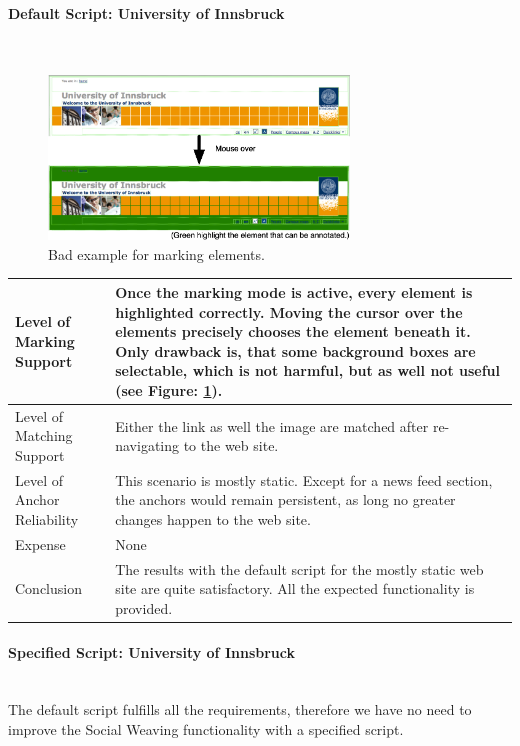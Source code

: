 \paragraph{Default Script: University of Innsbruck}\mbox{}\\
\begin{figure}\centering
		\includegraphics[width=8cm]{images/bad-example-backgroundbox.png}
		\caption{Bad example for marking elements.}
		\label{bad-example-backgroundbox}
\end{figure} 
\begin{tabular}{|p{}| p{} |}
\hline 
Level of Marking Support & Once the marking mode is active, every element is highlighted correctly. Moving the cursor over the elements precisely chooses the element beneath it. Only drawback is, that some background boxes are selectable, which is not harmful, but as well not useful (see Figure: \ref{bad-example-backgroundbox}).\\ 
\hline 
Level of Matching Support & Either the link as well the image are matched after re-navigating to the web site. \\ 
\hline 
Level of Anchor Reliability & This scenario is mostly static. Except for a news feed section, the anchors would remain persistent, as long no greater changes happen to the web site. \\ 
\hline 
Expense & None \\ 
\hline 
Conclusion & The results with the default script for the mostly static web site are quite satisfactory. All the expected functionality is provided. \\ 
\hline 
\end{tabular} 
\paragraph{Specified Script: University of Innsbruck}\mbox{}\\
The default script fulfills all the requirements, therefore we have no need to improve the Social Weaving functionality with a specified script. 

